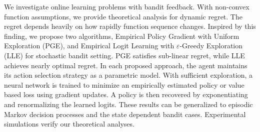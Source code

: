 We investigate online learning problems with bandit feedback. With non-convex function assumptions, we provide theoretical analysis for dynamic regret. The regret depends heavily on how rapidly function sequence changes. Inspired by this finding, we propose two algorithms, Empirical Policy Gradient with Uniform Exploration (PGE), and Empirical Logit Learning with $\varepsilon$-Greedy Exploration (LLE) for stochastic bandit setting. PGE satisfies sub-linear regret, while LLE achieves nearly optimal regret. In each proposed approach, the agent maintains its action selection strategy as a parametric model. With sufficient exploration, a neural network is trained to minimize an empirically estimated policy or value based loss using gradient updates. A policy is then recovered by exponentiating and renormalizing the learned logits. These results can be generalized to episodic Markov decision processes and the state dependent bandit cases. Experimental simulations verify our theoretical analyses.
